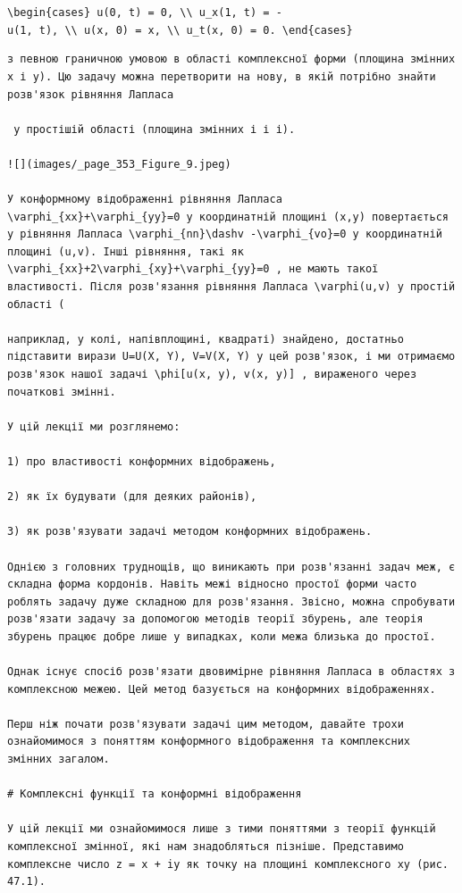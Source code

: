 \documentclass[
  ukrainian,
]{article}
\begin{document}
\texttt{\textbackslash{}begin\{cases\}\ u(0,\ t)\ =\ 0,\ \textbackslash{}\textbackslash{}\ u\_x(1,\ t)\ =\ -u(1,\ t),\ \textbackslash{}\textbackslash{}\ u(x,\ 0)\ =\ x,\ \textbackslash{}\textbackslash{}\ u\_t(x,\ 0)\ =\ 0.\ \textbackslash{}end\{cases\}}

\begin{verbatim}
з певною граничною умовою в області комплексної форми (площина змінних x і y). Цю задачу можна перетворити на нову, в якій потрібно знайти розв'язок рівняння Лапласа

 у простішій області (площина змінних і і і).

![](images/_page_353_Figure_9.jpeg)

У конформному відображенні рівняння Лапласа \varphi_{xx}+\varphi_{yy}=0 у координатній площині (x,y) повертається у рівняння Лапласа \varphi_{nn}\dashv -\varphi_{vo}=0 у координатній площині (u,v). Інші рівняння, такі як \varphi_{xx}+2\varphi_{xy}+\varphi_{yy}=0 , не мають такої властивості. Після розв'язання рівняння Лапласа \varphi(u,v) у простій області (

наприклад, у колі, напівплощині, квадраті) знайдено, достатньо підставити вирази U=U(X, Y), V=V(X, Y) у цей розв'язок, і ми отримаємо розв'язок нашої задачі \phi[u(x, y), v(x, y)] , вираженого через початкові змінні.

У цій лекції ми розглянемо:

1) про властивості конформних відображень,

2) як їх будувати (для деяких районів),

3) як розв'язувати задачі методом конформних відображень.

Однією з головних труднощів, що виникають при розв'язанні задач меж, є складна форма кордонів. Навіть межі відносно простої форми часто роблять задачу дуже складною для розв'язання. Звісно, можна спробувати розв'язати задачу за допомогою методів теорії збурень, але теорія збурень працює добре лише у випадках, коли межа близька до простої.

Однак існує спосіб розв'язати двовимірне рівняння Лапласа в областях з комплексною межею. Цей метод базується на конформних відображеннях.

Перш ніж почати розв'язувати задачі цим методом, давайте трохи ознайомимося з поняттям конформного відображення та комплексних змінних загалом.

# Комплексні функції та конформні відображення

У цій лекції ми ознайомимося лише з тими поняттями з теорії функцій комплексної змінної, які нам знадобляться пізніше. Представимо комплексне число z = x + iy як точку на площині комплексного xy (рис. 47.1).


\end{verbatim}
\end{document}
